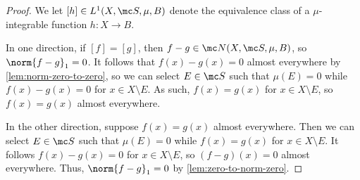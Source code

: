\documentclass[../notes.tex]{subfiles}
\begin{document}
\begin{proof}
	We let $[h]\in L^1(X,\mc S,\mu,B)$ denote the equivalence class of a $\mu$-integrable function $h\colon X\to B$.

	In one direction, if $[f]=[g]$, then $f-g\in\mc N(X,\mc S,\mu,B)$, so $\norm{f-g}_1=0$. It follows that $f(x)-g(x)=0$ almost everywhere by \autoref{lem:norm-zero-to-zero}, so we can select $E\in\mc S$ such that $\mu(E)=0$ while $f(x)-g(x)=0$ for $x\in X\setminus E$. As such, $f(x)=g(x)$ for $x\in X\setminus E$, so $f(x)=g(x)$ almost everywhere.

	In the other direction, suppose $f(x)=g(x)$ almost everywhere. Then we can select $E\in\mc S$ such that $\mu(E)=0$ while $f(x)=g(x)$ for $x\in X\setminus E$. It follows $f(x)-g(x)=0$ for $x\in X\setminus E$, so $(f-g)(x)=0$ almost everywhere. Thus, $\norm{f-g}_1=0$ by \autoref{lem:zero-to-norm-zero}.
\end{proof}
\end{document}
